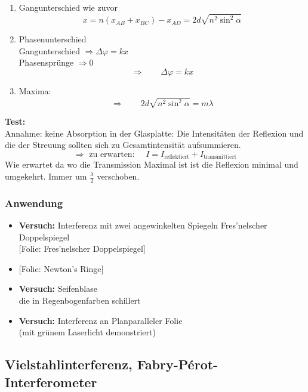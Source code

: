 \documentclass[titlepage,11pt,a4paper,ngerman]{report}
\newcommand{\tx}[1]{\textrm{#1}}
\newcommand{\folie}[1]{\color{gray}[Folie: #1]\color{black}}
\newcommand{\versuch}[1]{\color{red!50!black} \textbf{Versuch:} \color{black} #1\\ }
\newcommand{\lcom}[1]{\color{MidnightBlue}#1\color{black}}
\begin{document}
\begin{enumerate}[(1)]
	\item Gangunterschied wie zuvor
	\begin{equation*}
	x = n (x_{AB} + x_{BC}) - x_{AD} = 2 d \sqrt{n^2 \sin^2 \alpha}
	\end{equation*}
	\item Phasenunterschied\\
	Gangunterschied $ \Rightarrow \Delta \varphi = kx $\\
	Phasensprünge $ \Rightarrow 0 $
	\begin{equation*}
	\Rightarrow \qquad \Delta \varphi = kx
	\end{equation*}
	\item Maxima:
	\begin{equation*}
	\Rightarrow \qquad 2d\sqrt{n^2 \sin^2 \alpha} = m \lambda
	\end{equation*}
\end{enumerate}
\textbf{Test:}\\
Annahme: keine Absorption in der Glasplatte: \lcom{Die Intensitäten der Reflexion und die der Streuung sollten sich zu Gesamtintensität aufsummieren. }
\begin{equation*}
\Rightarrow \tx{ zu erwarten: } \quad I = I_{\tx{reflektiert}} + I_{\tx{transmittiert}}
\end{equation*}
Wie erwartet da wo die Transmission Maximal ist ist die Reflexion minimal und umgekehrt. Immer um $ \frac{\lambda}{2} $ verschoben.
\subsubsection{Anwendung}
\begin{itemize}
	\item \versuch{Interferenz mit zwei angewinkelten Spiegeln Fres'nelscher Doppelspiegel}
	\folie{Fres'nelscher Doppelspiegel}
	\item \folie{Newton's Ringe}
	\item \versuch{Seifenblase} die in Regenbogenfarben schillert
	\item \versuch{Interferenz an Planparalleler Folie} (mit grünem Laserlicht demonstriert)
\end{itemize}

\subsection{Vielstahlinterferenz, Fabry-P\'erot-Interferometer}
\end{document}
